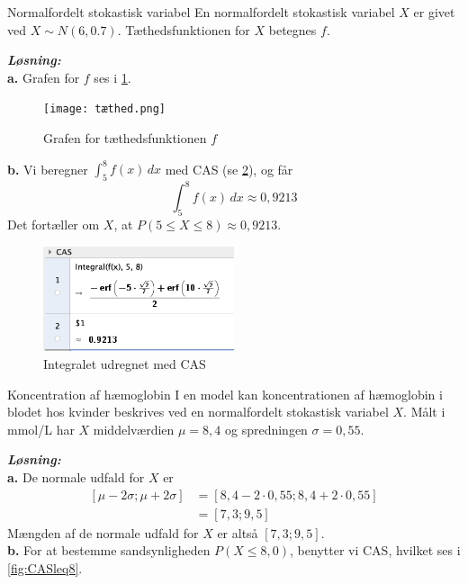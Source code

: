 \documentclass{article}
\newcommand{\sol}{\setlength{\parindent}{0cm}\textbf{\textit{Løsning:}}\setlength{\parindent}{1cm}}
\begin{document}
\begin{question}{Normalfordelt stokastisk variabel}{}
  En normalfordelt stokastisk variabel $X$ er givet ved $X \sim  N(6,0.7)$. 
  Tæthedsfunktionen for $X$ betegnes $f$. 
\end{question}
\sol \\
\textbf{a.}
Grafen for $f$ ses i \cref{fig:tæthed}. 
\begin{figure}[H]
\begin{center}
  \texttt{[image: tæthed.png]}
\end{center}
\caption{Grafen for tæthedsfunktionen $f$ }
\label{fig:tæthed}
\end{figure}
\noindent\textbf{b.}
Vi beregner $\int_{5}^{8} f(x) \,dx $ med CAS (se \cref{fig:CASint}), og får 
\[
\int_{5}^{8} f(x) \,dx \approx 0,9213
\] 
Det fortæller om $X$, at $P(5 \leq X \leq 8)\approx 0,9213$.
\begin{figure}[H]
\begin{center}
  \includegraphics[width=0.5\textwidth]{CASint.png}
\end{center}
\caption{Integralet udregnet med CAS}
\label{fig:CASint}
\end{figure}
\begin{question}{Koncentration af hæmoglobin}{}
I en model kan koncentrationen af hæmoglobin i blodet hos kvinder beskrives ved en normalfordelt stokastisk variabel $X.$
Målt i mmol/L har $X$ middelværdien $\mu=8,4$ og spredningen $\sigma=0,55.$
\end{question}
\sol \\
\textbf{a.}
De normale udfald for $X$ er 
\begin{equation*}
\begin{split}
  [\mu - 2 \sigma; \mu + 2 \sigma ] &=[8,4 - 2 \cdot 0,55; 8,4 + 2 \cdot 0,55]\\
  &=[7,3;9,5]
\end{split}
\end{equation*}
Mængden af de normale udfald for $X$ er altså $[7,3;9,5]$.\\[1ex]
\textbf{b.}
For at bestemme sandsynligheden $P(X \leq 8,0)$, benytter vi CAS, hvilket ses i \cref{fig:CASleq8}.
\end{document}
